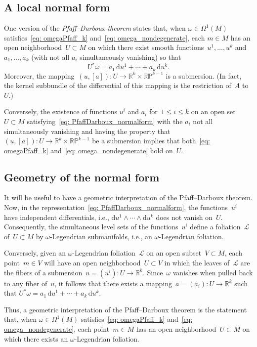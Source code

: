 \documentclass[10pt,a4paper]{amsart}
\renewcommand{\d}{\mathrm{d}}%
\newcommand{\cL}{{\mathcal L}}
\newcommand{\bbR}{{\mathbb R}}
\newcommand{\w}{\wedge}
\numberwithin{equation}{section}
\begin{document}
\subsection{A local normal form}
One version of the \emph{Pfaff--Darboux theorem}
\cite[Chapter II, Theorem~3.1]{MR1083148} states that,
when ${\omega\in\Omega^1(M)}$ satisfies~\eqref{eq: omegaPfaff_k}
and~\eqref{eq: omega_nondegenerate},
each $m\in M$
has an open neighborhood~$U\subset M$
on which there exist smooth functions~$u^1,\ldots,u^k$
and $a_1,\ldots,a_k$ (with not all $a_i$ simultaneously vanishing)
so that
\begin{equation}\label{eq: PfaffDarboux_normalform}
U^*\omega = a_1\,\d u^1 + \cdots + a_k\,\d u^k .
\end{equation}
Moreover,
the mapping~$(u,[a])\colon U\to\bbR^k\times\mathbb{RP}^{k-1}$
is a submersion. (In fact, the kernel subbundle of the differential
of this mapping is the restriction of~$A$ to~$U$.)

Conversely, the existence of functions $u^i$ and $a_i$ for~$1\le i\le k$
on an open set~$U\subset M$ satisfying~\eqref{eq: PfaffDarboux_normalform}
with the $a_i$ not all simultaneously vanishing and having the
property that $(u,[a]) \colon U\to\bbR^k\times\mathbb{RP}^{k-1}$
be a submersion implies that both~\eqref{eq: omegaPfaff_k}
and~\eqref{eq: omega_nondegenerate} hold on~$U$.

\subsection{Geometry of the normal form}
It will be useful to have a geometric interpretation
of the Pfaff--Darboux theorem.
Now, in the representation~\eqref{eq: PfaffDarboux_normalform},
the functions~$u^i$ have independent differentials,
i.e., $\d u^1\w\cdots\w\d u^k$ does not vanish on~$U$.
Consequently, the simultaneous level sets of the functions~$u^i$
define a foliation~$\cL$ of~$U\subset M$
by $\omega$-Legendrian submanifolds, i.e., an $\omega$-Legendrian foliation.

Conversely, given an $\omega$-Legendrian foliation~$\cL$
on an open subset~$V\subset M$, each point~$m\in V$ will
have an open neighborhood~$U\subset V$ in which the leaves of~$\cL$
are the fibers of a submersion~${u = (u^i) \colon U\to\bbR^k}$.
Since~$\omega$ vanishes when pulled back to any fiber of~$u$,
it follows that there exists a mapping~$a = (a_i) \colon U\to\bbR^k$
such that $U^*\omega = a_1\,\d u^1 + \cdots + a_k\,\d u^k$.

Thus, a geometric interpretation of the Pfaff--Darboux theorem
is the statement that,
when $\omega\in\Omega^1(M)$ satisfies~\eqref{eq: omegaPfaff_k}
and~\eqref{eq: omega_nondegenerate}, each point~$m\in M$
has an open neighborhood~$U\subset M$
on which there exists an $\omega$-Legendrian foliation.
\end{document}
